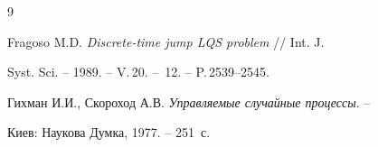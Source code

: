 \begin{thebibliography}{9} 


 




Fragoso M.D. {\em Discrete-time jump LQS problem} // Int. J.


Syst. Sci. -- 1989. -- V.\,20. -- \No\,12. -- P.\,2539--2545.







Гихман И.И., Скороход А.В. {\em Управляемые случайные процессы}. --


Киев: Наукова Думка, 1977. -- 251~с.





\end{thebibliography} 


 


\vskip 2cm 


 









 


